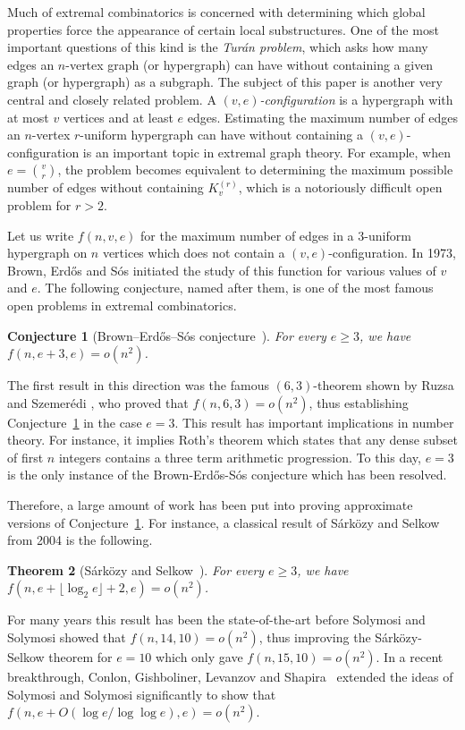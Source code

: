 \documentclass[11pt]{article}
\numberwithin{equation}{section}
\theoremstyle{plain}
\newtheorem{theorem}{Theorem}[section]
\newtheorem{conjecture}[theorem]{Conjecture}
\theoremstyle{remark}
\begin{document}
Much of extremal combinatorics is concerned with determining which global properties force the appearance of certain local substructures. One of the most important questions of this kind is the \emph{Tur\'an problem}, which asks how many edges an $n$-vertex graph (or hypergraph) can have without containing a given graph (or hypergraph) as a subgraph. The subject of this paper is another very central and closely related problem. A \emph{$(v,e)$-configuration} is a hypergraph with at most $v$ vertices and at least $e$ edges. Estimating the maximum number of edges an $n$-vertex $r$-uniform hypergraph can have without containing a $(v,e)$-configuration is an important topic in extremal graph theory. For example, when $e=\binom{v}{r}$, the problem becomes equivalent to determining the maximum possible number of edges without containing $K_v^{(r)}$, which is a notoriously difficult open problem for $r>2$.

Let us write $f(n, v, e)$ for the maximum number of edges in a $3$-uniform hypergraph on $n$ vertices which does not contain a $(v, e)$-configuration. In 1973, Brown, Erd\H os and S\' os \cite{BES73,BES73_2} initiated the study of this function for various values of $v$ and $e$. The following conjecture, named after them, is one of the most famous open problems in extremal combinatorics.

\begin{conjecture}[Brown--Erd\H os--S\'os conjecture~\cite{BES73,BES73_2}] \label{conj:BESConj}
    For every $e\geq 3$, we have $f(n,e+3,e)=o(n^2)$.
\end{conjecture}

The first result in this direction was the famous $(6, 3)$-theorem shown by Ruzsa and Szemer\'edi \cite{RS76}, who proved that $f(n, 6, 3)=o(n^2)$, thus establishing Conjecture~\ref{conj:BESConj} in the case $e=3$. 
This result has important implications in number theory. For instance, it implies Roth's theorem which states that any dense subset of first $n$ integers contains a three term arithmetic progression.
To this day, $e=3$ is the only instance of the Brown-Erd\H{o}s-S\'os conjecture which has been resolved. 

Therefore, a large amount of work has been put into proving approximate versions of Conjecture~\ref{conj:BESConj}. For instance, a classical result of S\'ark\"ozy and Selkow \cite{SS04} from 2004 is the following.
\begin{theorem}[S\'ark\"ozy and Selkow~\cite{SS04}]
For every $e \ge 3$, we have  $f(n, e+\lfloor \log_2 e\rfloor +2, e)=o(n^2)$.
\end{theorem}
For many years this result has been the state-of-the-art before Solymosi and Solymosi \cite{SS17} showed that $f(n, 14, 10)=o(n^2)$, thus improving the S\'ark\"ozy-Selkow theorem for $e=10$ which only gave $f(n, 15, 10)=o(n^2)$. In a recent breakthrough, Conlon, Gishboliner, Levanzov and Shapira~\cite{CGLS23} extended the ideas of Solymosi and Solymosi significantly to show that $f(n, e+O(\log e/\log\log e), e)=o(n^2)$. 
\end{document}

